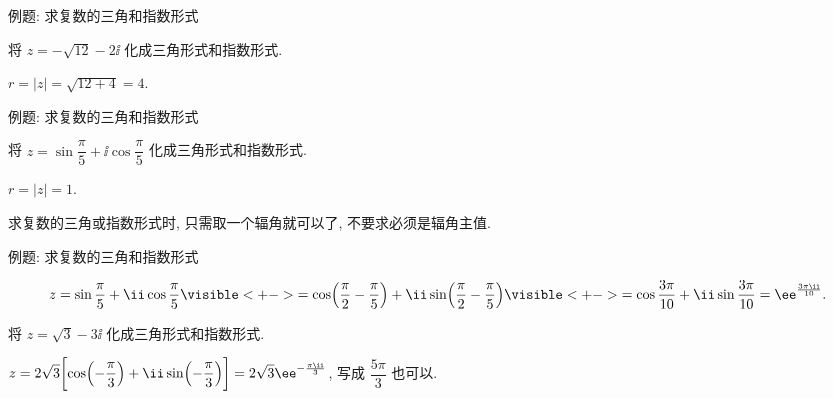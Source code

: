\begin{frame}{例题: 求复数的三角和指数形式}
	\onslide<+->
	\begin{example}[nearnext]
		将 $z=-\sqrt{12}-2\ii$ 化成三角形式和指数形式.
	\end{example}
	\onslide<+->
	\begin{solution}[nearprev]
		$r=|z|=\sqrt{12+4}=4$.
		\onslide<+->{%
			故
			\[
				z=4\left[\cos\Bigl(-\frac{5\pi}6\Bigr)+\ii\sin\Bigl(-
				\frac{5\pi}6\Bigr)\right]=4\ee^{-\frac{5\pi\ii}6}.
			\]
		}
		\meddel
	\end{solution}
\end{frame}


\begin{frame}{例题: 求复数的三角和指数形式}
	\beqskip{10pt}
	\onslide<+->
	\begin{example}[nearnext]
		将 $z=\sin\dfrac\pi5+\ii\cos\dfrac\pi5$ 化成三角形式和指数形式.
	\end{example}
	\onslide<+->
	\begin{solution}[nearprev]
		$r=|z|=1$.
		\onslide<+->{%
			\[
				z=\cos\frac{3\pi}{10}+\ii\sin\frac{3\pi}{10}=\ee^{\frac{3\pi\ii}{10}}.
			\]
		}\bigdel
	\end{solution}
	\onslide<+->
	求复数的三角或指数形式时, 只需取一个辐角就可以了, 不要求必须是辐角主值.
	\endgroup
\end{frame}


\begin{frame}{例题: 求复数的三角和指数形式}
	\onslide<+->
	\begin{solution}[][另解]
		\[
			z=\sin\frac\pi5+\ii\cos\frac\pi5
			\visible<+->{=\cos\Bigl(\frac\pi2-\frac\pi5\Bigr)+\ii\sin\Bigl(\frac\pi2-\frac\pi5\Bigr)}
			\visible<+->{=\cos\frac{3\pi}{10}+\ii\sin\frac{3\pi}{10}=\ee^{\frac{3\pi\ii}{10}}.}
		\]
		\bigdel
	\end{solution}
	\onslide<+->
	\begin{exercise}[nearnext]
		将 $z=\sqrt 3-3\ii$ 化成三角形式和指数形式.
	\end{exercise}
	\onslide<+->
	\begin{answer}[nearprev]
		$\displaystyle z=2\sqrt3\biggl[\cos\Bigl(-\frac{\pi}3\Bigr)+\ii\sin\Bigl(-\frac{\pi}3\Bigr)\biggr]
		=2\sqrt3 \ee^{-\frac{\pi\ii}3}$, 写成 $\dfrac{5\pi}3$ 也可以.
	\end{answer}
\end{frame}


